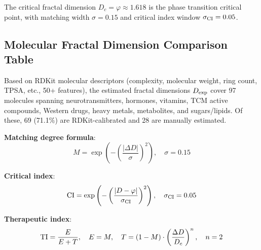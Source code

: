 \documentclass[12pt,a4paper,twocolumn]{article}
\renewcommand{\phi}{\varphi}
\begin{document}
The critical fractal dimension $D_c = \phi \approx 1.618$ is the phase transition critical point, with matching width $\sigma = 0.15$ and critical index window $\sigma_{\rm CI} = 0.05$.

\subsection{Molecular Fractal Dimension Comparison Table}
\label{subsec:molecule_table_en}

Based on RDKit molecular descriptors (complexity, molecular weight, ring count, TPSA, etc., 50+ features), the estimated fractal dimensions $D_{\rm exp}$ cover 97 molecules spanning neurotransmitters, hormones, vitamins, TCM active compounds, Western drugs, heavy metals, metabolites, and sugars/lipids. Of these, 69 (71.1\%) are RDKit-calibrated and 28 are manually estimated.

\textbf{Matching degree formula}:
\begin{equation}
M = \exp\left(-\left(\frac{|\Delta D|}{\sigma}\right)^2\right), \quad \sigma = 0.15
\end{equation}

\textbf{Critical index}:
\begin{equation}
{\rm CI} = \exp\left(-\left(\frac{|D - \phi|}{\sigma_{\rm CI}}\right)^2\right), \quad \sigma_{\rm CI} = 0.05
\end{equation}

\textbf{Therapeutic index}:
\begin{equation}
{\rm TI} = \frac{E}{E + T}, \quad E = M, \quad T = (1-M)\cdot\left(\frac{\Delta D}{D_c}\right)^n, \quad n = 2
\end{equation}
\end{document}
